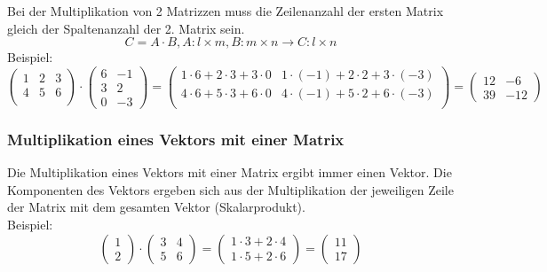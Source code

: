 Bei der Multiplikation von 2 Matrizzen muss die Zeilenanzahl der ersten Matrix gleich der Spaltenanzahl der 2. Matrix sein. 
\begin{equation}
	C = A \cdot B, A : l \times m, B : m \times n \rightarrow C : l \times n
\end{equation}
Beispiel: 
\begin{displaymath}
	\left(\begin{array}{ccc}1 & 2 & 3 \\4 & 5 & 6 \\\end{array}\right) \cdot
	\left(\begin{array}{cc}6 & -1 \\3 & 2 \\0 & -3\end{array}\right)
	=\left(\begin{array}{cc}1 \cdot 6  +  2 \cdot 3  +  3 \cdot 0 &
	  1 \cdot (-1) +  2 \cdot 2 +  3 \cdot (-3) \\4 \cdot 6  +  5 \cdot 3  +  6 \cdot 0 &
	  4 \cdot (-1) +  5 \cdot 2 +  6 \cdot (-3) \\\end{array}\right)
	=\left(\begin{array}{cc}12 & -6 \\39 & -12\end{array}\right)
\end{displaymath}

\subsubsection{Multiplikation eines Vektors mit einer Matrix}
\label{ssub:multiplikation_eines_vektors_mit_einer_matrix}

Die Multiplikation eines Vektors mit einer Matrix ergibt immer einen Vektor. Die Komponenten des Vektors ergeben sich
aus der Multiplikation der jeweiligen Zeile der Matrix mit dem gesamten Vektor (Skalarprodukt).
\\Beispiel:
\begin{displaymath}
	\left(\begin{array}{c}1\\2\end{array}\right) \cdot \left(\begin{array}{cc}3 & 4\\5 & 6\end{array}\right)
	= \left(\begin{array}{c}1 \cdot 3 + 2 \cdot 4 
	\\ 1 \cdot 5 + 2 \cdot 6 \end{array}\right) = \left(\begin{array}{c}11\\17\end{array}\right)
\end{displaymath}

